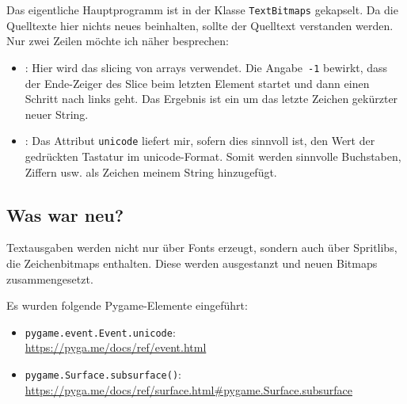 Das eigentliche Hauptprogramm ist in der Klasse \texttt{TextBitmaps} gekapselt. Da die Quelltexte hier nichts neues beinhalten, sollte der Quelltext verstanden werden. Nur zwei Zeilen möchte ich näher besprechen:

\begin{itemize}
    \item {}: Hier wird das \gls{slicing} von \glspl{array} verwendet. Die Angabe~\texttt{-1} bewirkt, dass der Ende-Zeiger des Slice beim letzten Element startet und dann einen Schritt nach links geht. Das Ergebnis ist ein um das letzte Zeichen gekürzter neuer String.

    \item {}: Das Attribut \texttt{unicode} liefert mir, sofern dies sinnvoll ist, den Wert der gedrückten Tastatur im \gls{unicode}-Format. Somit werden sinnvolle Buchstaben, Ziffern usw. als Zeichen meinem String hinzugefügt.
\end{itemize}





\subsection*{Was war neu?}

Textausgaben werden nicht nur über Fonts erzeugt, sondern auch über Spritlibs, die Zeichenbitmaps enthalten. Diese werden ausgestanzt und neuen Bitmaps zusammengesetzt.

Es wurden folgende Pygame-Elemente eingeführt:

\begin{itemize}
	\item \texttt{pygame.event.Event.unicode}:
	\\ \url{https://pyga.me/docs/ref/event.html}

	\item \texttt{pygame.Surface.subsurface()}:
	\\ \url{https://pyga.me/docs/ref/surface.html#pygame.Surface.subsurface}
	
\end{itemize}
